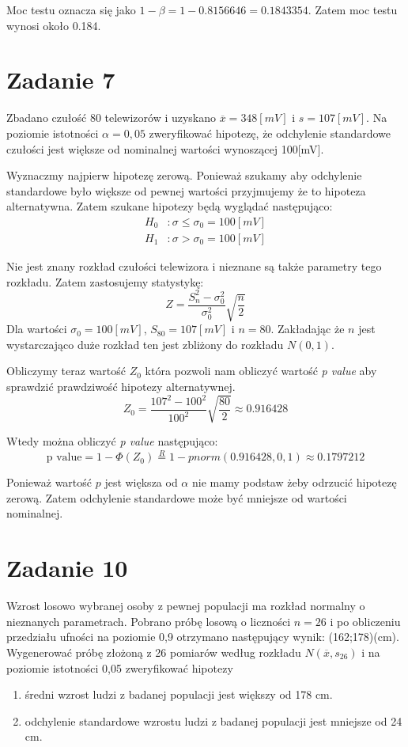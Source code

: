 \documentclass{article}
\begin{document}
Moc testu oznacza się jako $1 - \beta = 1 - 0.8156646 = 0.1843354$. Zatem moc testu wynosi około 0.184.


\section{Zadanie 7}
Zbadano czułość 80 telewizorów i uzyskano $\overline{x}=348[mV]$ i $s=107[mV]$. Na poziomie istotności $\alpha=0,05$ zweryfikować hipotezę, że odchylenie standardowe czułości jest większe od nominalnej wartości wynoszącej 100[mV]. \\ \par

Wyznaczmy najpierw hipotezę zerową. Ponieważ szukamy aby odchylenie standardowe było większe od pewnej wartości przyjmujemy że to hipoteza alternatywna. Zatem szukane hipotezy będą wyglądać następująco:
\begin{align*}
H_0 &: \sigma \leq \sigma_0 = 100 [mV] \\
H_1 &: \sigma > \sigma_0 = 100 [mV]
\end{align*}

Nie jest znany rozkład czułości telewizora i nieznane są także parametry tego rozkładu. Zatem zastosujemy statystykę:
\[ Z = \frac{S_n^2-\sigma_0^2}{\sigma_0^2} \sqrt{\frac{n}{2}} \]
Dla wartości $\sigma_0 = 100 [mV]$, $S_{80} = 107 [mV]$ i $n=80$. Zakładając że $n$ jest wystarczająco duże rozkład ten jest zbliżony do rozkładu $N(0,1)$. \\ \par

Obliczymy teraz wartość $Z_0$ która pozwoli nam obliczyć wartość \textit{p value} aby sprawdzić prawdziwość hipotezy alternatywnej.
\[ Z_0 = \frac{107^2 - 100^2}{100^2} \sqrt{ \frac{80}{2} } \approx 0.916428 \]

Wtedy można obliczyć \textit{p value} następująco:
\[ \text{p value} = 1 - \Phi(Z_0) \overset{R}{=} 1 - pnorm(0.916428, 0, 1) \approx 0.1797212 \]

Ponieważ wartość $p$ jest większa od $\alpha$ nie mamy podstaw żeby odrzucić hipotezę zerową. Zatem odchylenie standardowe może być mniejsze od wartości nominalnej.

\section{Zadanie 10}
Wzrost losowo wybranej osoby z pewnej populacji ma rozkład normalny o nieznanych parametrach. Pobrano próbę losową o liczności $n=26$ i po obliczeniu przedziału ufności na poziomie 0,9 otrzymano następujący wynik: (162;178)(cm). Wygenerować próbę złożoną z 26 pomiarów według rozkładu $N(\overline{x},s_{26})$ i na poziomie istotności 0,05 zweryfikować hipotezy
\begin{enumerate}[label = \alph*)]
\item średni wzrost ludzi z badanej populacji jest większy od 178 cm.
\item odchylenie standardowe wzrostu ludzi z badanej populacji jest mniejsze od 24 cm.
\end{enumerate}
\end{document}
